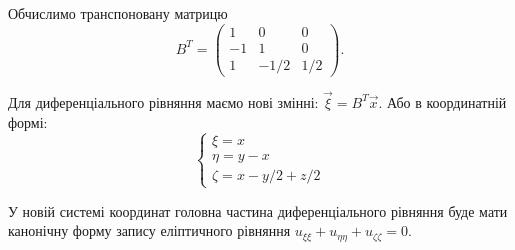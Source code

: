 \begin{solution*}
	Обчислимо транспоновану матрицю \[ B^T = \begin{pmatrix} 1 & 0 & 0 \\ -1 & 1 & 0 \\ 1 & -1/2 & 1/2 \end{pmatrix}. \]

	Для диференціального рівняння маємо нові змінні: $\vec \xi = B^T \vec x$. Або в координатній формі: \[ \left\{ \begin{matrix} \xi = x \\ \eta = y - x \\ \zeta = x - y / 2 + z / 2 \end{matrix} \right. \]

	У новій системі координат головна частина диференціального рівняння буде мати канонічну форму запису еліптичного рівняння $u_{\xi\xi} + u_{\eta\eta} + u_{\zeta\zeta} = 0$.
\end{solution*}